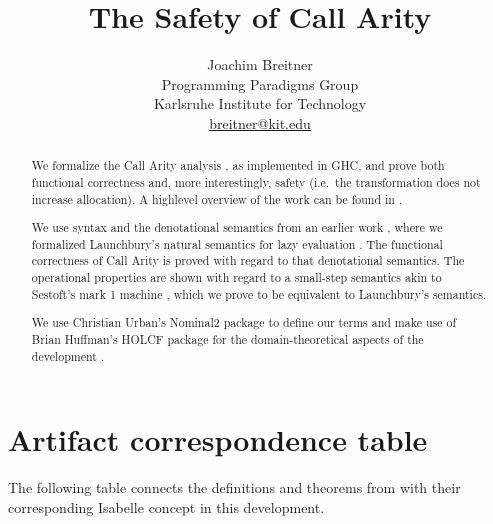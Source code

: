 \documentclass[11pt,a4paper,parskip=half]{scrartcl}
\begin{document}
\title{The Safety of Call Arity}
\author{Joachim Breitner\\
Programming Paradigms Group\\
Karlsruhe Institute for Technology\\
\url{breitner@kit.edu}}
\maketitle


\begin{abstract}
We formalize the Call Arity analysis \cite{tfp}, as implemented in GHC, and prove both functional correctness and, more interestingly, safety (i.e.\ the transformation does not increase allocation). A highlevel overview of the work can be found in \cite{call-arity-preprint}.

We use syntax and the denotational semantics from an earlier work \cite{breitner2013}, where we formalized Launchbury's natural semantics for lazy evaluation \cite{launchbury}. 
The functional correctness of Call Arity is proved with regard to that denotational semantics.
The operational properties are shown with regard to a small-step semantics akin to Sestoft's mark 1 machine \cite{sestoft}, which we prove to be equivalent to Launchbury's semantics.

We use Christian Urban's Nominal2 package \cite{nominal} to define our terms and make use of Brian Huffman's HOLCF package for the domain-theoretical aspects of the development \cite{holcf}.

\end{abstract}

\section*{Artifact correspondence table}
\label{sec:table}

The following table connects the definitions and theorems from \cite{call-arity-preprint} with their corresponding Isabelle concept in this development.

\newcommand{\seetheory}[1]{\hyperref[sec_#1]{#1}}
\end{document}
